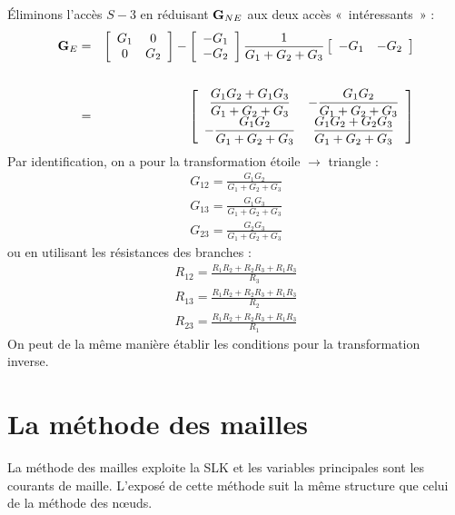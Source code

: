 \begin{testexample}
Éliminons l'accès $S-3$ en réduisant ${\bf G}_{NE}$ aux deux accès
«~intéressants~» : 
\begin{eqnarray*}
	{\bf G}_E &=&
	\left[
	\begin{array}{cc}
		G_1 & 0\\ 0 & G_2
	\end{array} \right] - \left[
	\begin{array}{c}
		-G_1 \\-G_2
	\end{array}\right] \frac{1}{G_1+G_2+G_3} \left[
	\begin{array}{cc}
		-G_1 & -G_2
	\end{array}\right] \\[6mm] & = & \left[ 
	\begin{array}{cc}\displaystyle 
		\frac{G_1G_2+G_1G_3}{G_1+G_2+G_3} & \displaystyle 
		-\frac{G_1G_2}{G_1+G_2+G_3}\\\displaystyle 
		-\frac{G_1G_2}{G_1+G_2+G_3} & \displaystyle \frac{G_1G_2+G_2G_3}{G_1+G_2+G_3} 
	\end{array}\right]
\end{eqnarray*}
Par identification, on a  pour la transformation étoile $\rightarrow$ triangle :
\[\begin{array}{c}
G_{12}=\frac{G_1G_2}{G_1+G_2+G_3}\\[4mm]
G_{13}=\frac{G_1G_3}{G_1+G_2+G_3}\\[4mm]
G_{23}=\frac{G_2G_3}{G_1+G_2+G_3}
\end{array}\]
ou en utilisant les résistances des branches : 
\[\begin{array}{c}
R_{12}=\frac{R_1R_2+R_2R_3+R_1R_3}{R_3}\\[4mm]
R_{13}=\frac{R_1R_2+R_2R_3+R_1R_3}{R_2}\\[4mm]
R_{23}=\frac{R_1R_2+R_2R_3+R_1R_3}{R_1}
\end{array} \]
On peut de la même manière établir les conditions pour la transformation inverse.
\end{testexample}

\section{La méthode des mailles}
\label{sec:MM}

La méthode des mailles exploite la SLK et les variables principales sont les courants de maille. L'exposé de cette méthode suit la même structure que celui de la méthode des nœuds.



